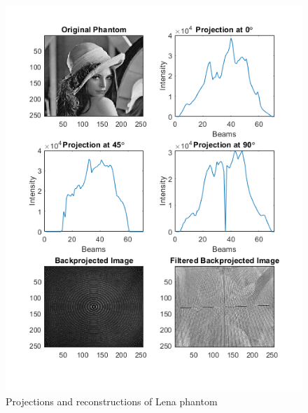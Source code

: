 \documentclass[journal]{IEEEtran}
\begin{document}
\begin{figure}[h]
\centering
\includegraphics[width=\columnwidth,height=.3\textheight]{images/lenaprojected.png}
\caption{Projections and reconstructions of Lena phantom}\label{fig:lane}
\end{figure}
\end{document}
